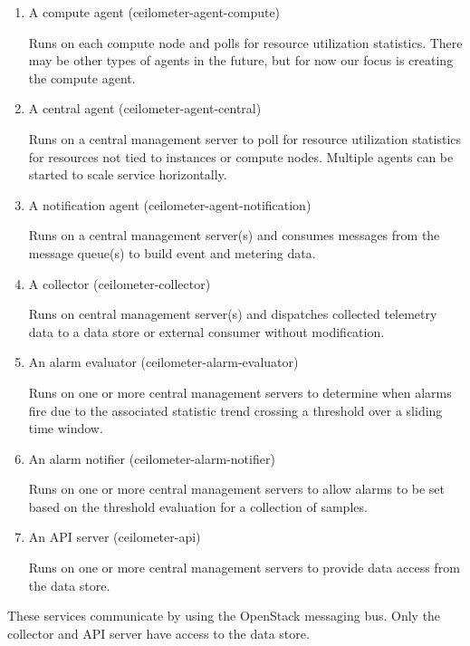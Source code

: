     \begin{enumerate}
        \item A compute agent (ceilometer-agent-compute)
        \par Runs on each compute node and polls for resource utilization statistics. There may be other types of agents in the future, but for now our focus is creating the compute agent.
        
        \item A central agent (ceilometer-agent-central)
        \par Runs on a central management server to poll for resource utilization statistics for resources not tied to instances or compute nodes. Multiple agents can be started to scale service horizontally.
        
        \item A notification agent (ceilometer-agent-notification)
        \par Runs on a central management server(s) and consumes messages from the message queue(s) to build event and metering data.
        
        \item A collector (ceilometer-collector)
        \par Runs on central management server(s) and dispatches collected telemetry data to a data store or external consumer without modification.
        
        \item An alarm evaluator (ceilometer-alarm-evaluator)
        \par Runs on one or more central management servers to determine when alarms fire due to the associated statistic trend crossing a threshold over a sliding time window.
        
        \item An alarm notifier (ceilometer-alarm-notifier)
        \par Runs on one or more central management servers to allow alarms to be set based on the threshold evaluation for a collection of samples.
        
        \item An API server (ceilometer-api)
        \par Runs on one or more central management servers to provide data access from the data store.
    \end{enumerate}
    \par These services communicate by using the OpenStack messaging bus. Only the collector and API server have access to the data store.
